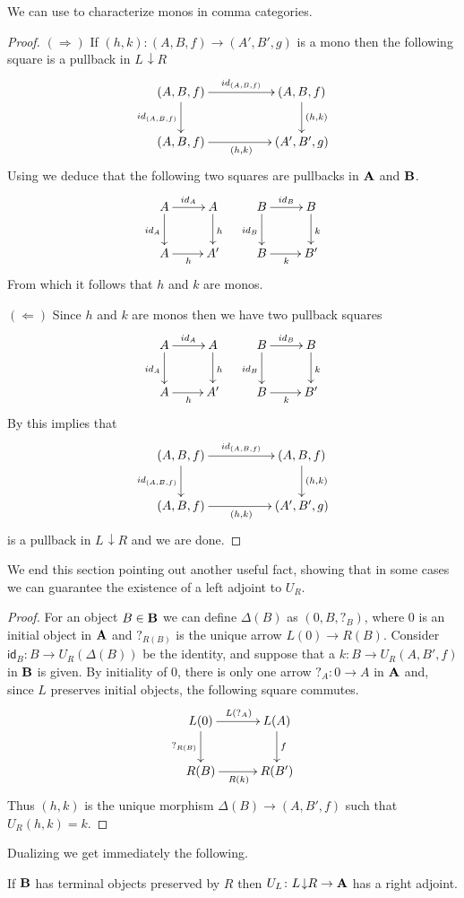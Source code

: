 \documentclass[runningheads,envcountsect]{lipics-v2021}
\def\B{\textbf {\textup{B}}}
\def\A{\textbf {\textup{A}}}
\newcommand{\comma}[2]{#1\hspace{1pt} {\downarrow}#2}
\newcommand{\id}[1]{\mathsf{id}_{#1}}
\begin{document}
We can use  to characterize monos in comma categories. 
\begin{proof}
	$(\Rightarrow)$  If $(h,k)\colon (A,B,f)\to (A', B', g)$ is a mono then the following square is a pullback in $\comma{L}{R}$
	\[\xymatrix@C=50pt{(A, B, f)  \ar[r]^{\id{(A,B,f)}} \ar[d]_{\id{(A,B,f)}}& (A, B, f)  \ar[d]^{(h,k)} \\ (A, B, f)  \ar[r]_{(h,k)}& (A', B', g) }\]
	Using  we deduce that the following two squares are pullbacks in $\A$ and $\B$.
	\[\xymatrix{A \ar[r]^{\id{A}} \ar[d]_{\id{A}} & A \ar[d]^{h} & B \ar[r]^{\id{B}} \ar[d]_{\id{B}} & B  \ar[d]^{k}\\ A \ar[r]_{h} & A' & B \ar[r]_{k} & B'}\]
	From which it follows that $h$ and $k$ are monos.
	
	\smallskip\noindent 
	$(\Leftarrow)$ Since $h$ and $k$ are monos then we have two pullback squares 	
	\[\xymatrix{A \ar[r]^{\id{A}} \ar[d]_{\id{A}} & A \ar[d]^{h} & B \ar[r]^{\id{B}} \ar[d]_{\id{B}} & B  \ar[d]^{k}\\ A \ar[r]_{h} & A' & B \ar[r]_{k} & B'}\]
	By  this implies that 
	\[\xymatrix@C=50pt{(A, B, f)  \ar[r]^{\id{(A,B,f)}} \ar[d]_{\id{(A,B,f)}}& (A, B, f)  \ar[d]^{(h,k)} \\ (A, B, f)  \ar[r]_{(h,k)}& (A', B', g) }\]
	is a pullback in $\comma{L}{R}$ and we are done.   
\end{proof}

We end this section pointing out another useful fact,  showing that in some cases we can guarantee  the existence of a left adjoint to $U_R$. 

\begin{proof} For an object $B\in \B$ we can define $\Delta(B)$ as $(0, B, ?_{B})$, where $0$ is an initial object in $\A$ and $?_{R(B)}$ is the unique arrow $L(0)\to R(B)$. Consider $\id{B}\colon B\to U_R(\Delta(B))$ be the identity, and suppose that a $k\colon B\to U_R(A, B', f)$ in $\B$ is given. By initiality of $0$, there is only one arrow $?_A\colon 0\to A $ in $\A$ and, since $L$ preserves initial objects, the following square commutes.
	\[\xymatrix@C=30pt{L(0) \ar[r]^{L(?_A)} \ar[d]_{?_{R(B)}} & L(A) \ar[d]^{f}\\ R(B) \ar[r]_{R(k)}& R(B')}\]
	Thus $(h,k)$ is the unique morphism $\Delta(B)\to (A, B', f)$	such that $U_R(h,k)=k$.   
\end{proof}
Dualizing we get immediately the following.
\begin{corollary}If $\B$ has terminal objects preserved by $R$ then $U_L\colon \comma{L}{R}\to \A$ has a right adjoint.
\end{corollary}
\end{document}
